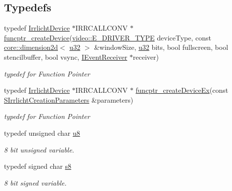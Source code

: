 \subsection*{Typedefs}
\begin{DoxyCompactItemize}
\item 
\mbox{\label{namespaceirr_ac684947a1da4b3acd8e86f5a32581ab6}} 
typedef \hyperlink{classirr_1_1IrrlichtDevice}{Irrlicht\+Device} $\ast$I\+R\+R\+C\+A\+L\+L\+C\+O\+NV $\ast$ \hyperlink{namespaceirr_ac684947a1da4b3acd8e86f5a32581ab6}{funcptr\+\_\+create\+Device}(\hyperlink{namespaceirr_1_1video_ae35a6de6d436c76107ad157fe42356d0}{video\+::\+E\+\_\+\+D\+R\+I\+V\+E\+R\+\_\+\+T\+Y\+PE} device\+Type, const \hyperlink{classirr_1_1core_1_1dimension2d}{core\+::dimension2d}$<$ \hyperlink{namespaceirr_a0416a53257075833e7002efd0a18e804}{u32} $>$ \&window\+Size, \hyperlink{namespaceirr_a0416a53257075833e7002efd0a18e804}{u32} bits, bool fullscreen, bool stencilbuffer, bool vsync, \hyperlink{classirr_1_1IEventReceiver}{I\+Event\+Receiver} $\ast$receiver)
\begin{DoxyCompactList}\small\item\em typedef for Function Pointer \end{DoxyCompactList}\item 
\mbox{\label{namespaceirr_a8951ac2554f9ccd5fe1fcb6fdc13b258}} 
typedef \hyperlink{classirr_1_1IrrlichtDevice}{Irrlicht\+Device} $\ast$I\+R\+R\+C\+A\+L\+L\+C\+O\+NV $\ast$ \hyperlink{namespaceirr_a8951ac2554f9ccd5fe1fcb6fdc13b258}{funcptr\+\_\+create\+Device\+Ex}(const \hyperlink{structirr_1_1SIrrlichtCreationParameters}{S\+Irrlicht\+Creation\+Parameters} \&parameters)
\begin{DoxyCompactList}\small\item\em typedef for Function Pointer \end{DoxyCompactList}\item 
typedef unsigned char \hyperlink{namespaceirr_a646874f69af8ff87fc10201b0254a761}{u8}
\begin{DoxyCompactList}\small\item\em 8 bit unsigned variable. \end{DoxyCompactList}\item 
typedef signed char \hyperlink{namespaceirr_adc3ec66d7537550be0fea1c9eeadd63d}{s8}
\begin{DoxyCompactList}\small\item\em 8 bit signed variable. \end{DoxyCompactList}\item 

\end{DoxyCompactItemize}
